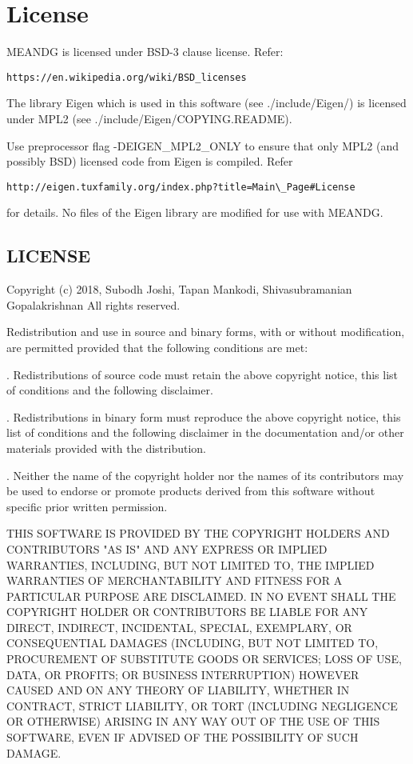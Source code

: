 \chapter{License}\label{license}

MEANDG is licensed under BSD-3 clause license. Refer: \begin{verbatim}https://en.wikipedia.org/wiki/BSD_licenses\end{verbatim}
The library Eigen which is used in this software (see ./include/Eigen/) is licensed under MPL2 (see ./include/Eigen/COPYING.README). 

\noindent Use preprocessor flag -DEIGEN\_MPL2\_ONLY to ensure that only MPL2 (and possibly BSD) licensed code from Eigen is compiled. 
Refer \begin{verbatim}http://eigen.tuxfamily.org/index.php?title=Main\_Page#License\end{verbatim} for details. 
No files of the Eigen library are modified for use with MEANDG.

\section{LICENSE}

\noindent Copyright (c) 2018, Subodh Joshi, Tapan Mankodi, Shivasubramanian Gopalakrishnan
All rights reserved.

\noindent Redistribution and use in source and binary forms, with or without modification, are permitted provided that the following conditions are met:

. Redistributions of source code must retain the above copyright notice, this list of conditions and the following disclaimer.

. Redistributions in binary form must reproduce the above copyright notice, this list of conditions and the following disclaimer in the documentation and/or other materials provided with the distribution.

. Neither the name of the copyright holder nor the names of its contributors may be used to endorse or promote products derived from this software without specific prior written permission.

\begin{scriptsize}
\noindent THIS SOFTWARE IS PROVIDED BY THE COPYRIGHT HOLDERS AND CONTRIBUTORS "AS IS" AND ANY EXPRESS OR IMPLIED WARRANTIES, INCLUDING, BUT NOT LIMITED TO, THE IMPLIED WARRANTIES OF MERCHANTABILITY AND FITNESS FOR A PARTICULAR PURPOSE ARE DISCLAIMED. IN NO EVENT SHALL THE COPYRIGHT HOLDER OR CONTRIBUTORS BE LIABLE FOR ANY DIRECT, INDIRECT, INCIDENTAL, SPECIAL, EXEMPLARY, OR CONSEQUENTIAL DAMAGES (INCLUDING, BUT NOT LIMITED TO, PROCUREMENT OF SUBSTITUTE GOODS OR SERVICES; LOSS OF USE, DATA, OR PROFITS; OR BUSINESS INTERRUPTION) HOWEVER CAUSED AND ON ANY THEORY OF LIABILITY, WHETHER IN CONTRACT, STRICT LIABILITY, OR TORT (INCLUDING NEGLIGENCE OR OTHERWISE) ARISING IN ANY WAY OUT OF THE USE OF THIS SOFTWARE, EVEN IF ADVISED OF THE POSSIBILITY OF SUCH DAMAGE.
\end{scriptsize}
